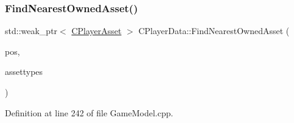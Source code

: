 \subsubsection{\texorpdfstring{Find\+Nearest\+Owned\+Asset()}{FindNearestOwnedAsset()}}
{\footnotesize\ttfamily std\+::weak\+\_\+ptr$<$ \hyperlink{classCPlayerAsset}{C\+Player\+Asset} $>$ C\+Player\+Data\+::\+Find\+Nearest\+Owned\+Asset (\begin{DoxyParamCaption}\item[{const \hyperlink{classCPosition}{C\+Position} \&}]{pos,  }\item[{const std\+::vector$<$ \hyperlink{GameDataTypes_8h_a5600d4fc433b83300308921974477fec}{E\+Asset\+Type} $>$}]{assettypes }\end{DoxyParamCaption})}



Definition at line 242 of file Game\+Model.\+cpp.


